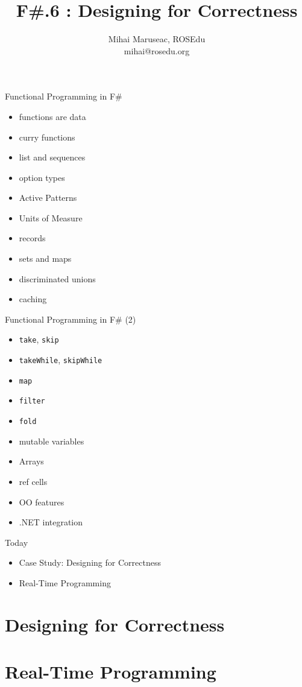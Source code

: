 \documentclass{beamer}
\title{F\#.6 : Designing for Correctness}
\author{Mihai Maruseac, ROSEdu\\mihai@rosedu.org}
\begin{document}
\maketitle

\begin{frame}
  \tableofcontents
\end{frame}

\begin{frame}{Functional Programming in F\#}
  \begin{itemize}
    \item functions are data
    \item curry functions
    \item list and sequences
    \item option types
    \item Active Patterns
    \item Units of Measure
    \item records
    \item sets and maps
    \item discriminated unions
    \item caching
  \end{itemize}
\end{frame}

\begin{frame}{Functional Programming in F\# (2)}
  \begin{itemize}
    \item \texttt{take}, \texttt{skip}
    \item \texttt{takeWhile}, \texttt{skipWhile}
    \item \texttt{map}
    \item \texttt{filter}
    \item \texttt{fold}
    \item mutable variables
    \item Arrays
    \item ref cells
    \item OO features
    \item .NET integration
  \end{itemize}
\end{frame}

\begin{frame}{Today}
  \begin{itemize}
    \item Case Study: Designing for Correctness
    \item Real-Time Programming
  \end{itemize}
\end{frame}

\section{Designing for Correctness}
\frame{\tableofcontents[currentsection]}

\section{Real-Time Programming}
\frame{\tableofcontents[currentsection]}
\end{document}
